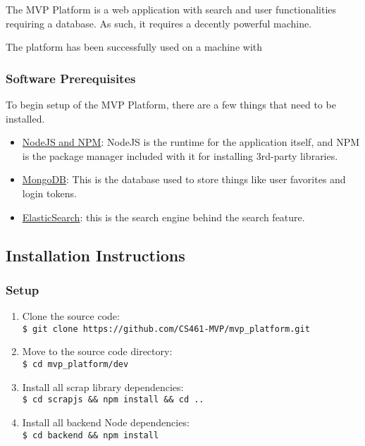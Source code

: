 \documentclass[onecolumn, draftclsnofoot,10pt, compsoc]{IEEEtran}
\begin{document}
\noindent The MVP Platform is a web application with search and user functionalities requiring a database. As such, it requires a decently powerful machine.

\noindent The platform has been successfully used on a machine with 

\subsubsection{Software Prerequisites}

To begin setup of the MVP Platform, there are a few things that need to be installed.

\begin{itemize}
	\item \href{https://docs.npmjs.com/getting-started/installing-node}{NodeJS and NPM}: NodeJS is the runtime for the application itself, and NPM is the package manager included with it for installing 3rd-party libraries.
	\item \href{https://docs.mongodb.com/manual/installation/}{MongoDB}: This is the database used to store things like user favorites and login tokens.
	\item \href{https://www.elastic.co/guide/en/elasticsearch/guide/current/running-elasticsearch.html}{ElasticSearch}: this is the search engine behind the search feature.
\end{itemize}


\subsection{Installation Instructions}

\subsubsection{Setup}

\begin{enumerate}
	\item Clone the source code: \\
	\hspace*{1.5em}\verb|$ git clone https://github.com/CS461-MVP/mvp_platform.git |
	\item Move to the source code directory: \\
	\hspace*{1.5em}\verb|$ cd mvp_platform/dev|
	\item Install all scrap library dependencies: \\
	\hspace*{1.5em}\verb|$ cd scrapjs && npm install && cd ..|
	\item Install all backend Node dependencies: \\
	\hspace*{1.5em}\verb|$ cd backend && npm install |
\end{enumerate}
\end{document}
